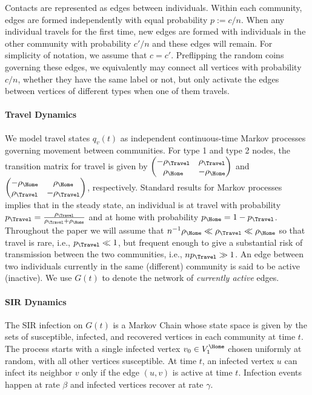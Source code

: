 \documentclass[11pt]{article}
\begin{document}
Contacts are represented as edges between individuals. Within each community, edges are formed independently with equal probability $p := c/n$. When any individual travels for the first time, new edges are formed with individuals in the other community with probability $c'/n$ and these edges will remain. For simplicity of notation, we assume that $c = c'$.  Preflipping the random coins governing these edges, we equivalently may connect all vertices with probability $c/n$, whether they have the same label or not, but only activate the edges between vertices of different types when one of them travels.


\paragraph{Travel Dynamics} 
We model travel states $q_v(t)$ as independent continuous-time Markov processes governing movement between communities. 
For type 1 and type 2 nodes, the  transition matrix for travel is given by $\begin{pmatrix}
    -\rho_\Travel & \rho_\Travel \\
    \rho_\Home & -\rho_\Home
\end{pmatrix}$ and  $\begin{pmatrix}
    -\rho_\Home & \rho_\Home \\
    \rho_\Travel & -\rho_\Travel
\end{pmatrix}$, respectively. Standard results for Markov processes implies that in the steady state, an individual is at travel with probability $p_\Travel = \frac{\rho_\Travel}{\rho_\Travel + \rho_\Home}$ and at home with probability $p_\Home = 1 - p_\Travel$. Throughout the paper we will assume that $n^{-1}\rho_\Home \ll \rho_\Travel \ll \rho_\Home$ so that travel is rare, i.e., $p_\Travel \ll 1$, but frequent enough to give a substantial risk of transmission between the two communities, i.e., $n p_\Travel\gg 1$.
An edge between two individuals currently in the same (different) community is said to be active (inactive). We use $G(t)$ to denote the network of \emph{currently active} edges.

\paragraph{SIR Dynamics}
The SIR infection on $G(t)$ is a Markov Chain whose state space is given by the sets of susceptible, infected, and recovered vertices in each community at time $t$. The process starts with a single infected vertex $v_0\in V_1^\Home$ chosen uniformly at random, with all other vertices susceptible. At time $t$, an infected vertex $u$ can infect its neighbor $v$ only if the edge $(u, v)$ is active at time $t$. Infection events happen at rate $\beta$ and infected vertices recover at rate $\gamma$.
\end{document}
